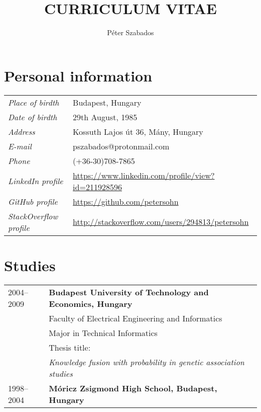 \documentclass[a4paper,10pt]{article}
\title{\textbf{CURRICULUM VITAE}}
\author{Péter Szabados}
\newcommand{\pont}[1]{\emph{#1}}
\begin{document}
\maketitle

\section*{Personal information}
\begin{tabular}{ll}
 \pont{Place of birdth}&Budapest, Hungary\\
 \pont{Date of birdth}&29th August, 1985\\
 \pont{Address}&Kossuth Lajos út 36, Mány, Hungary\\
 \pont{E-mail}&pszabados@protonmail.com\\
 \pont{Phone}&(+36-30)708-7865\\
 \pont{LinkedIn profile}&\href{https://www.linkedin.com/profile/view?id=211928596}{https://www.linkedin.com/profile/view?id=211928596}\\
 \pont{GitHub profile}&\href{https://github.com/petersohn}{https://github.com/petersohn}\\
 \pont{StackOverflow profile}&\href{http://stackoverflow.com/users/294813/petersohn}{http://stackoverflow.com/users/294813/petersohn}\\
\end{tabular}

\section*{Studies}
\begin{tabular}{ll}
 2004--2009
  &\textbf{Budapest University of Technology and Economics, Hungary}\\
  &Faculty of Electrical Engineering and Informatics\\
  &Major in Technical Informatics\\
  &Thesis title:\\
  &\emph{Knowledge fusion with probability in genetic association studies}\\
  1998--2004&\textbf{Móricz Zsigmond High School, Budapest, Hungary}
\end{tabular}
\end{document}

